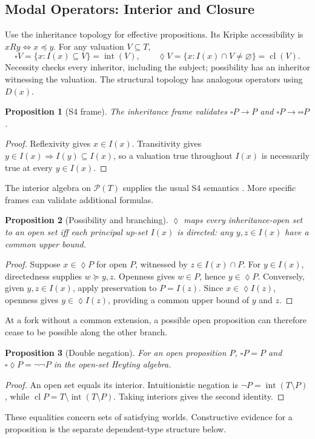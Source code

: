 \documentclass{article}
\newtheorem{proposition}{Proposition}[section]
\begin{document}
\subsection{Modal Operators: Interior and Closure}\label{sec:modal}

Use the inheritance topology for effective propositions. Its Kripke
accessibility is $xRy\iff x\preceq y$. For any valuation $V\subseteq T$,
\[
 \square V=\{x:I(x)\subseteq V\}=\operatorname{int}(V),\qquad
 \lozenge V=\{x:I(x)\cap V\ne\varnothing\}=\operatorname{cl}(V).
\]
Necessity checks every inheritor, including the subject; possibility has an
inheritor witnessing the valuation. The structural topology has analogous
operators using $D(x)$.

\begin{proposition}[S4 frame]
The inheritance frame validates $\square P\to P$ and
$\square P\to\square\square P$.
\end{proposition}
\begin{proof}
Reflexivity gives $x\in I(x)$. Transitivity gives
$y\in I(x)\Rightarrow I(y)\subseteq I(x)$, so a valuation true throughout
$I(x)$ is necessarily true at every $y\in I(x)$.
\end{proof}
The interior algebra on $\mathcal P(T)$ supplies the usual S4 semantics
\cite{modal}. More specific frames can validate additional formulas.

\begin{proposition}[Possibility and branching]
$\lozenge$ maps every inheritance-open set to an open set iff each
principal up-set $I(x)$ is directed: any $y,z\in I(x)$ have a common
upper bound.
\end{proposition}
\begin{proof}
Suppose $x\in\lozenge P$ for open $P$, witnessed by $z\in I(x)\cap P$.
For $y\in I(x)$, directedness supplies $w\succeq y,z$. Openness gives
$w\in P$, hence $y\in\lozenge P$. Conversely, given $y,z\in I(x)$,
apply preservation to $P=I(z)$. Since $x\in\lozenge I(z)$, openness gives
$y\in\lozenge I(z)$, providing a common upper bound of $y$ and $z$.
\end{proof}
At a fork without a common extension, a possible open proposition can
therefore cease to be possible along the other branch.

\begin{proposition}[Double negation]
For an open proposition $P$, $\square P=P$ and $\square\lozenge P=\neg\neg P$
in the open-set Heyting algebra.
\end{proposition}
\begin{proof}
An open set equals its interior. Intuitionistic negation is
$\neg P=\operatorname{int}(T\setminus P)$, while
$\operatorname{cl}P=T\setminus\operatorname{int}(T\setminus P)$.
Taking interiors gives the second identity.
\end{proof}
These equalities concern sets of satisfying worlds. Constructive evidence
for a proposition is the separate dependent-type structure below.
\end{document}
